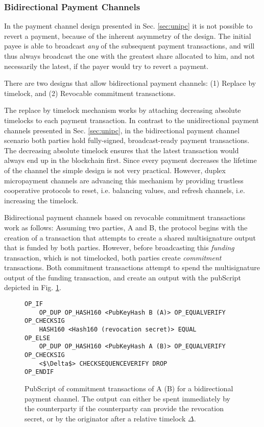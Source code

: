 \subsubsection{Bidirectional Payment Channels}

In the payment channel design presented in Sec. \ref{sec:unipc} it is not possible to revert a payment, because of the inherent asymmetry of the design. The initial payee is able to broadcast \emph{any} of the subsequent payment transactions, and will thus always broadcast the one with the greatest share allocated to him, and not necessarily the latest, if the payer would try to revert a payment. 

There are two designs that allow bidirectional payment channels: (1) Replace by timelock, and (2) Revocable commitment transactions.


The replace by timelock mechanism works by attaching decreasing absolute timelocks to each payment transaction. In contrast to the unidirectional payment channels presented in Sec. \ref{sec:unipc}, in the bidirectional payment channel scenario both parties hold fully-signed, broadcast-ready payment transactions. The decreasing absolute timelock ensures that the latest transaction would always end up in the blockchain first. Since every payment decreases the lifetime of the channel the simple design is not very practical. However, duplex micropayment channels are advancing this mechanism by providing trustless cooperative protocols to reset, i.e. balancing values, and refresh channels, i.e. increasing the timelock. 

Bidirectional payment channels based on revocable commitment transactions work as follows:
Assuming two parties, A and B, the protocol begins with the creation of a transaction that attempts to create a shared multisignature output that is funded by both parties. However, before broadcasting this \emph{funding} transaction, which is not timelocked, both parties create \emph{commitment} transactions. Both commitment transactions attempt to spend the multisignature output of the funding transaction, and create an output with the pubScript depicted in Fig. \ref{fig:pubScriptCommitment}.

\begin{figure}
\begin{lstlisting}[breaklines,mathescape=true]
OP_IF
	OP_DUP OP_HASH160 <PubKeyHash B (A)> OP_EQUALVERIFY OP_CHECKSIG
	HASH160 <Hash160 (revocation secret)> EQUAL
OP_ELSE
	OP_DUP OP_HASH160 <PubKeyHash A (B)> OP_EQUALVERIFY OP_CHECKSIG
	<$\Delta$> CHECKSEQUENCEVERIFY DROP
OP_ENDIF
\end{lstlisting} 
\caption{PubScript of commitment transactions of A (B) for a bidirectional payment channel. The output can either be spent immediately by the counterparty if the counterparty can provide the revocation secret, or by the originator after a relative timelock $\Delta$.}
\label{fig:pubScriptCommitment}
\end{figure}

